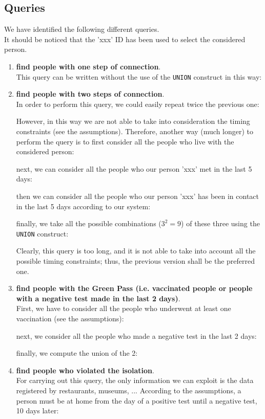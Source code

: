 \documentclass{article}
\begin{document}
\subsection{Queries}
We have identified the following different queries.\\ It should be noticed that the 'xxx' ID has been used to select the considered person.
\begin{enumerate}
    \item \textbf{find people with one step of connection}.\\ This query can be written without the use of the \verb|UNION| construct in this way:
    
    \item \textbf{find people with two steps of connection}. \\In order to perform this query, we could easily repeat twice the previous one:
    
    However, in this way we are not able to take into consideration the timing constraints (see the assumptions). Therefore, another way (much longer) to perform the query is to first consider all the people who live with the considered person:
    
    next, we can consider all the people who our person 'xxx' met in the last 5 days:
    
    then we can consider all the people who our person 'xxx' has been in contact in the last 5 days according to our system:
    
    finally, we take all the possible combinations ($3^2 = 9$) of these three using the \verb|UNION| construct:
    
    Clearly, this query is too long, and it is not able to take into account all the possible timing constraints; thus, the previous version shall be the preferred one.
    \item \textbf{find people with the Green Pass (i.e. vaccinated people or people with a negative test made in the last 2 days)}.\\ First, we have to consider all the people who underwent at least one vaccination (see the assumptions):
    
    next, we consider all the people who made a negative test in the last 2 days:
    
    finally, we compute the union of the 2:
    
    \item \textbf{find people who violated the isolation}.\\ For carrying out this query, the only information we can exploit is the data registered by restaurants, museums, ... According to the assumptions, a person must be at home from the day of a positive test until a negative test, 10 days later:

\end{enumerate}
\end{document}
